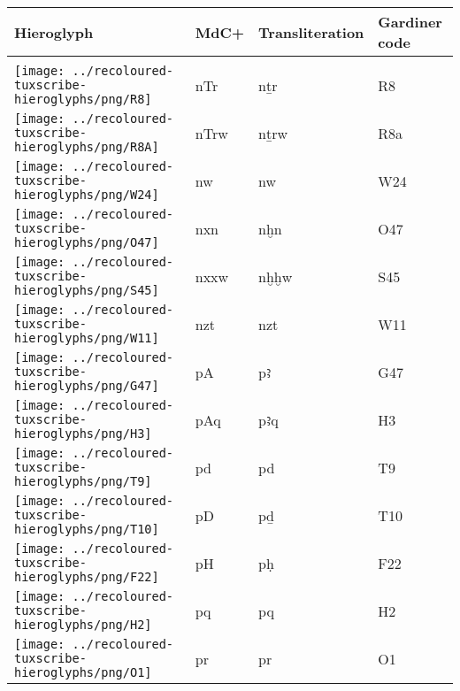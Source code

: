 \begin{center}
	\begin{tabularx}{\linewidth}{YYYY}
		Hieroglyph & MdC+ & Transliteration & Gardiner code\\
		\hline\\
		\texttt{[image: ../recoloured-tuxscribe-hieroglyphs/png/R8]} & nTr & nṯr & R8 \\ 
		\texttt{[image: ../recoloured-tuxscribe-hieroglyphs/png/R8A]} & nTrw & nṯrw & R8a \\ 
		\texttt{[image: ../recoloured-tuxscribe-hieroglyphs/png/W24]} & nw & nw & W24 \\ 
		\texttt{[image: ../recoloured-tuxscribe-hieroglyphs/png/O47]} & nxn & nḫn & O47 \\ 
		\texttt{[image: ../recoloured-tuxscribe-hieroglyphs/png/S45]} & nxxw & nḫḫw & S45 \\ 
		\texttt{[image: ../recoloured-tuxscribe-hieroglyphs/png/W11]} & nzt & nzt & W11 \\ 
		\texttt{[image: ../recoloured-tuxscribe-hieroglyphs/png/G47]} & pA & pꜣ & G47 \\ 
		\texttt{[image: ../recoloured-tuxscribe-hieroglyphs/png/H3]} & pAq & pꜣq & H3 \\ 
		\texttt{[image: ../recoloured-tuxscribe-hieroglyphs/png/T9]} & pd & pd & T9 \\ 
		\texttt{[image: ../recoloured-tuxscribe-hieroglyphs/png/T10]} & pD & pḏ & T10 \\ 
		\texttt{[image: ../recoloured-tuxscribe-hieroglyphs/png/F22]} & pH & pḥ & F22 \\ 
		\texttt{[image: ../recoloured-tuxscribe-hieroglyphs/png/H2]} & pq & pq & H2 \\ 
		\texttt{[image: ../recoloured-tuxscribe-hieroglyphs/png/O1]} & pr & pr & O1 \\ 
	\end{tabularx}
\end{center}


